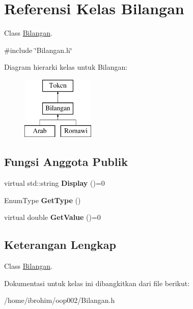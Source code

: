 \hypertarget{classBilangan}{}\section{Referensi Kelas Bilangan}
\label{classBilangan}


Class \hyperlink{classBilangan}{Bilangan}.  




{\ttfamily \#include \char`\"{}Bilangan.\+h\char`\"{}}

Diagram hierarki kelas untuk Bilangan\+:\begin{figure}[H]
\begin{center}
\leavevmode
\includegraphics[height=3.000000cm]{d2/dac/classBilangan}
\end{center}
\end{figure}
\subsection*{Fungsi Anggota Publik}
\begin{DoxyCompactItemize}
\item 
\hypertarget{classBilangan_ab2ee8800f19568a48bf9cc7a2e74bc3d}{}virtual std\+::string {\bfseries Display} ()=0\label{classBilangan_ab2ee8800f19568a48bf9cc7a2e74bc3d}

\item 
\hypertarget{classBilangan_a3bf3d5edae1146c224521ffef88343a5}{}Enum\+Type {\bfseries Get\+Type} ()\label{classBilangan_a3bf3d5edae1146c224521ffef88343a5}

\item 
\hypertarget{classBilangan_a0e5aa4a90d3fe974e806f39ebbf813b9}{}virtual double {\bfseries Get\+Value} ()=0\label{classBilangan_a0e5aa4a90d3fe974e806f39ebbf813b9}

\end{DoxyCompactItemize}


\subsection{Keterangan Lengkap}
Class \hyperlink{classBilangan}{Bilangan}. 

Dokumentasi untuk kelas ini dibangkitkan dari file berikut\+:\begin{DoxyCompactItemize}
\item 
/home/ibrohim/oop002/Bilangan.\+h\end{DoxyCompactItemize}

